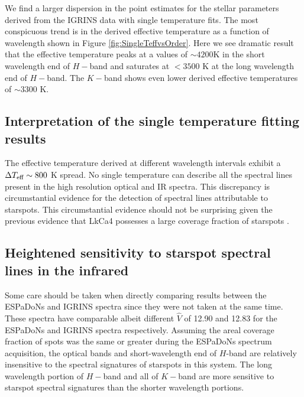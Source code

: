 \documentclass[twocolumn]{emulateapj}%
\newcommand{\name}{LkCa4 }
\begin{document}
We find a larger dispersion in the point estimates for the stellar parameters derived from the IGRINS data with single temperature fits.  The most conspicuous trend is in the derived effective temperature as a function of wavelength shown in Figure \ref{fig:SingleTeffvsOrder}.  Here we see dramatic result that the effective temperature peaks at a values of $\sim4200$K in the short wavelength end of $H-$band and saturates at $<3500$ K at the long wavelength end of $H-$band.  The $K-$band shows even lower derived effective temperatures of $\sim3300$ K.

\subsection{Interpretation of the single temperature fitting results}

The effective temperature derived at different wavelength intervals exhibit a $\Delta T_\textrm{eff} \sim 800$ K spread.  No single temperature can describe all the spectral lines present in the high resolution optical and IR spectra.  This discrepancy is circumstantial evidence for the detection of spectral lines attributable to starspots.  This circumstantial evidence should not be surprising given the previous evidence that \name possesses a large coverage fraction of starspots \citep{grankin08,donati14}.



\subsection{Heightened sensitivity to starspot spectral lines in the infrared}

Some care should be taken when directly comparing results between the ESPaDoNs and IGRINS spectra since they were not taken at the same time.  These spectra have comparable albeit different $\hat V$ of 12.90 and 12.83 for the ESPaDoNs and IGRINS spectra respectively.  Assuming the areal coverage fraction of spots was the same or greater during the ESPaDoNs spectrum acquisition, the optical bands and short-wavelength end of $H$-band are relatively insensitive to the spectral signatures of starspots in this system.  The long wavelength portion of $H-$band and all of $K-$band are more sensitive to starspot spectral signatures than the shorter wavelength portions.
\end{document}
